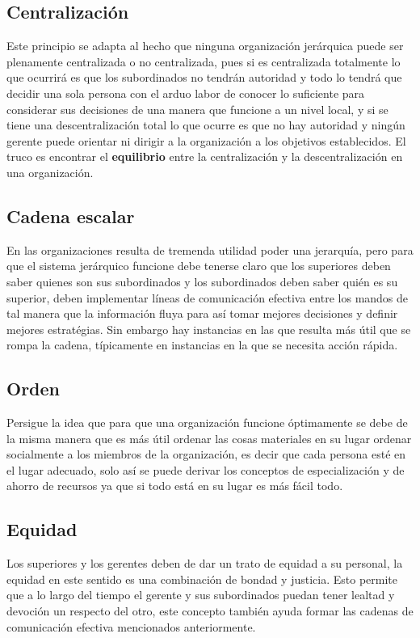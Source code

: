 \documentclass{article}
\begin{document}
\subsection{Centralización}
Este principio se adapta al hecho que ninguna organización jerárquica puede ser plenamente centralizada o no centralizada, pues si es centralizada totalmente lo que ocurrirá es que los subordinados no tendrán autoridad y todo lo tendrá que decidir una sola persona con el arduo labor de conocer lo suficiente para considerar sus decisiones de una manera que funcione a un nivel local, y si se tiene una descentralización total lo que ocurre es que no hay autoridad y ningún gerente puede orientar ni dirigir a la organización a los objetivos establecidos. El truco es encontrar el \textbf{equilibrio} entre la centralización y la descentralización en una organización.


\subsection{Cadena escalar}
En las organizaciones resulta de tremenda utilidad poder una jerarquía, pero para que el sistema jerárquico funcione debe tenerse claro que los superiores deben saber quienes son sus subordinados y los subordinados deben saber quién es su superior, deben implementar líneas de comunicación efectiva entre los mandos de tal manera que la información fluya para así tomar mejores decisiones y definir mejores estratégias. Sin embargo hay instancias en las que resulta más útil que se rompa la cadena, típicamente en instancias en la que se necesita acción rápida.


\subsection{Orden}
Persigue la idea que para que una organización funcione óptimamente se debe de la misma manera que es más útil ordenar las cosas materiales en su lugar ordenar socialmente a los miembros de la organización, es decir que cada persona esté en el lugar adecuado, solo así se puede derivar los conceptos de especialización y de ahorro de recursos ya que si todo está en su lugar es más fácil todo.


\subsection{Equidad}
Los superiores y los gerentes deben de dar un trato de equidad a su personal, la equidad en este sentido es una combinación de bondad y justicia. Esto permite que a lo largo del tiempo el gerente y sus subordinados puedan tener lealtad y devoción un respecto del otro, este concepto también ayuda formar las cadenas de comunicación efectiva mencionados anteriormente.
\end{document}
